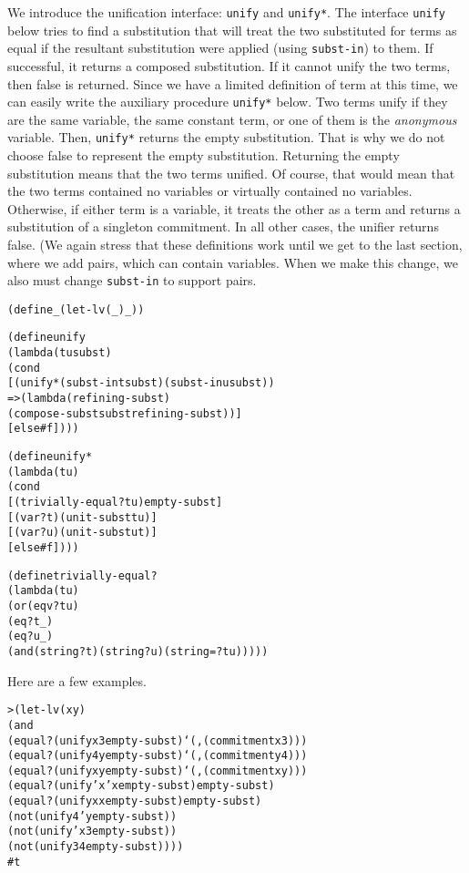 We introduce the unification interface: \texttt{unify} and
\texttt{unify*}.  The interface \texttt{unify} below tries to find a
substitution that will treat the two substituted for terms as equal if
the resultant substitution were applied (using \texttt{subst-in}) to
them.  If successful, it returns a composed substitution.  If it
cannot unify the two terms, then false is returned.  Since we have a
limited definition of term at this time, we can easily write the
auxiliary procedure \texttt{unify*} below.  Two terms unify if they
are the same variable, the same constant term, or one of them is the
\emph{anonymous} variable.  Then, \texttt{unify*} returns the empty
substitution.  That is why we do not choose false to represent the
empty substitution.  Returning the empty substitution means that the
two terms unified.  Of course, that would mean that the two terms
contained no variables or virtually contained no variables.
Otherwise, if either term is a variable, it treats the other as a term
and returns a substitution of a singleton commitment. In all other
cases, the unifier returns false.  (We again stress that these
definitions work until we get to the last section, where we add pairs,
which can contain variables.  When we make this change, we also must
change \texttt{subst-in} to support pairs.

\begin{alltt}
(define _ (let-lv (_) _))

(define unify
  (lambda (t u subst)
    (cond
      [(unify* (subst-in t subst) (subst-in u subst))
       => (lambda (refining-subst)
            (compose-subst subst refining-subst))]
      [else #f])))
\end{alltt}

\begin{alltt}
(define unify*
  (lambda (t u)
    (cond
      [(trivially-equal? t u) empty-subst]
      [(var? t) (unit-subst t u)]
      [(var? u) (unit-subst u t)]
      [else #f])))
\end{alltt}

\begin{alltt}
(define trivially-equal?
  (lambda (t u)
    (or (eqv? t u)
        (eq? t _)
        (eq? u _)
        (and (string? t) (string? u) (string=? t u)))))
\end{alltt}
Here are a few examples.

\begin{alltt}
> (let-lv (x y)
    (and
      (equal? (unify x 3 empty-subst) `(,(commitment x 3)))
      (equal? (unify 4 y empty-subst) `(,(commitment y 4)))
      (equal? (unify x y empty-subst) `(,(commitment x y)))
      (equal? (unify 'x 'x empty-subst) empty-subst)
      (equal? (unify x x empty-subst) empty-subst)
      (not (unify 4 'y empty-subst))
      (not (unify 'x 3 empty-subst))
      (not (unify 3 4 empty-subst))))
#t
\end{alltt}

